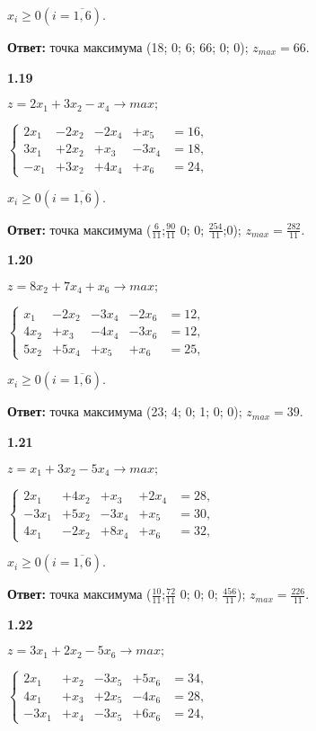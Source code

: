 \documentclass[10pt, a5paper, twoside]{article} %
\begin{document}
$x_i \geq 0 (i = \overline{1,6}).$

\textbf{Ответ: } точка максимума (18; 0; 6; 66; 0; 0); $z_{max} = 66.$

\textbf{1.19}

$z=2x_1 + 3x_2 - x_4\rightarrow max;$

$
\left\{
\begin{array}{ccccc}
2x_1  &-2x_2 &-2x_4  &+x_5  &=16, \\
3x_1 &+2x_2  &+x_3  &-3x_4  &=18, \\
-x_1   &+3x_2 &+4x_4   &+x_6   &=24,
\end{array}
\right.
$

$x_i \geq 0 (i = \overline{1,6}).$

\textbf{Ответ: } точка максимума ($\frac{6}{11}$;$\frac{90}{11}$ 0; 0; $\frac{254}{11}$;0); $z_{max} = \frac{282}{11}.$

\textbf{1.20}

$z=8x_2 + 7x_4 + x_6\rightarrow max;$

$
\left\{
\begin{array}{ccccc}
x_1  &-2x_2  &-3x_4  &-2x_6  &=12, \\
4x_2 &+x_3  &-4x_4  &-3x_6  &=12, \\
5x_2   &+5x_4 &+x_5   &+x_6   &=25,
\end{array}
\right.
$

$x_i \geq 0 (i = \overline{1,6}).$

\textbf{Ответ: } точка максимума (23; 4; 0; 1; 0; 0); $z_{max} = 39.$

\textbf{1.21}

$z=x_1 + 3x_2 - 5x_4\rightarrow max;$

$
\left\{
\begin{array}{ccccc}
2x_1   &+4x_2  &+x_3   &+2x_4  &=28, \\
-3x_1  &+5x_2  &-3x_4  &+x_5   &=30, \\
4x_1   &-2x_2  &+8x_4  &+x_6   &=32,
\end{array}
\right.
$

$x_i \geq 0 (i = \overline{1,6}).$

\textbf{Ответ: } точка максимума ($\frac{10}{11}$;$\frac{72}{11}$ 0; 0; 0; $\frac{456}{11}$); $z_{max} = \frac{226}{11}.$

\textbf{1.22}

$z=3x_1 + 2x_2 - 5x_6\rightarrow max;$

$
\left\{
\begin{array}{ccccc}
2x_1  &+x_2  &-3x_5  &+5x_6  &=34, \\
4x_1  &+x_3  &+2x_5  &-4x_6  &=28, \\
-3x_1 &+x_4  &-3x_5  &+6x_6  &=24,
\end{array}
\right.
$
\end{document}
